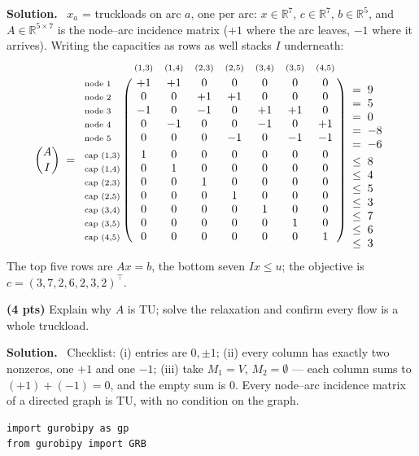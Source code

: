 \documentclass[10pt]{article}
\newenvironment{solution}
  {\par\smallskip\begingroup\color{solink}\textbf{Solution.}\ }
  {\endgroup\par}
\begin{document}
\begin{parts}
\begin{solution}
$x_a$ = truckloads on arc $a$, one per arc: $x \in \mathbb{R}^{7}$, $c \in \mathbb{R}^{7}$,
$b \in \mathbb{R}^{5}$, and $A \in \mathbb{R}^{5 \times 7}$ is the node--arc incidence matrix
($+1$ where the arc leaves, $-1$ where it arrives). Writing the capacities as rows as well
stacks $I$ underneath:
\[
\binom{A}{I} \;=\;
\bordermatrix{%
  & \scriptstyle (1,3) & \scriptstyle (1,4) & \scriptstyle (2,3) & \scriptstyle (2,5)
  & \scriptstyle (3,4) & \scriptstyle (3,5) & \scriptstyle (4,5) \cr
 \scriptstyle \text{node }1 & +1 & +1 &  0 &  0 &  0 &  0 &  0 \cr
 \scriptstyle \text{node }2 &  0 &  0 & +1 & +1 &  0 &  0 &  0 \cr
 \scriptstyle \text{node }3 & -1 &  0 & -1 &  0 & +1 & +1 &  0 \cr
 \scriptstyle \text{node }4 &  0 & -1 &  0 &  0 & -1 &  0 & +1 \cr
 \scriptstyle \text{node }5 &  0 &  0 &  0 & -1 &  0 & -1 & -1 \cr
 \noalign{\vskip3pt}
 \scriptstyle \text{cap }(1,3) & 1 & 0 & 0 & 0 & 0 & 0 & 0 \cr
 \scriptstyle \text{cap }(1,4) & 0 & 1 & 0 & 0 & 0 & 0 & 0 \cr
 \scriptstyle \text{cap }(2,3) & 0 & 0 & 1 & 0 & 0 & 0 & 0 \cr
 \scriptstyle \text{cap }(2,5) & 0 & 0 & 0 & 1 & 0 & 0 & 0 \cr
 \scriptstyle \text{cap }(3,4) & 0 & 0 & 0 & 0 & 1 & 0 & 0 \cr
 \scriptstyle \text{cap }(3,5) & 0 & 0 & 0 & 0 & 0 & 1 & 0 \cr
 \scriptstyle \text{cap }(4,5) & 0 & 0 & 0 & 0 & 0 & 0 & 1 \cr}
\begin{array}{l}
 \phantom{=\;0} \\
 =\;9 \\ =\;5 \\ =\;0 \\ =\;-8 \\ =\;-6 \\[3pt]
 \le\;8 \\ \le\;4 \\ \le\;5 \\ \le\;3 \\ \le\;7 \\ \le\;6 \\ \le\;3
\end{array}
\]
The top five rows are $Ax = b$, the bottom seven $Ix \le u$; the objective is
$c = (3, 7, 2, 6, 2, 3, 2)^{\top}$.
\end{solution}

\item \textbf{(4 pts)} Explain why $A$ is TU; solve the relaxation and confirm every flow
  is a whole truckload.

\begin{solution}
Checklist: (i) entries are $0, \pm 1$; (ii) every column has exactly two nonzeros, one
$+1$ and one $-1$; (iii) take $M_1 = V$, $M_2 = \emptyset$ --- each column sums to
$(+1) + (-1) = 0$, and the empty sum is $0$. Every node--arc incidence matrix of a directed
graph is TU, with no condition on the graph.
\begin{lstlisting}
import gurobipy as gp
from gurobipy import GRB


\end{lstlisting}
\end{solution}
\end{parts}
\end{document}
